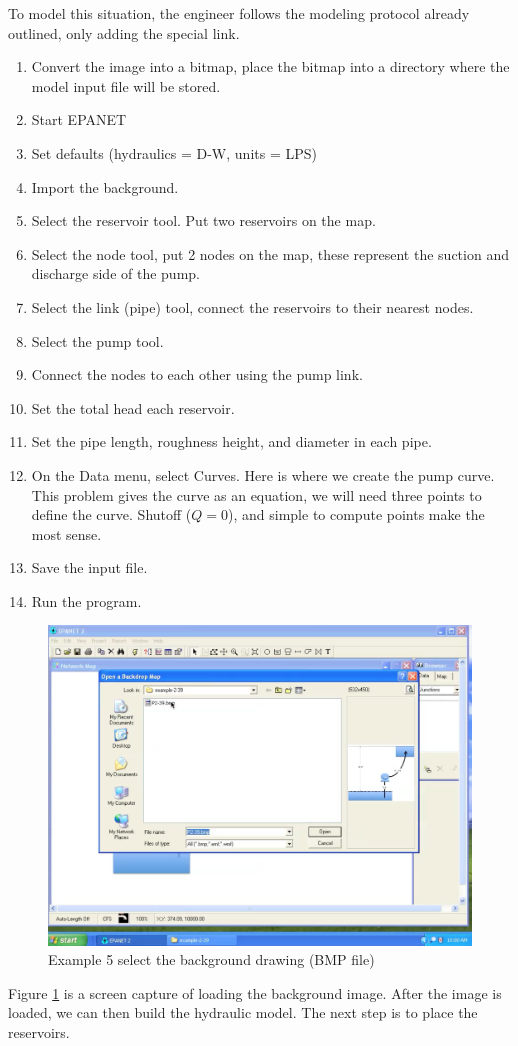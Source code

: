 To model this situation, the engineer follows the modeling protocol already outlined, only adding the special link.
\begin{enumerate}
\item Convert the image into a bitmap, place the bitmap into a directory where the model input file will be stored.
\item Start EPANET
\item Set defaults (hydraulics = D-W,  units = LPS)
\item Import the background.
\item Select the reservoir tool.  Put two reservoirs on the map.
\item Select the node tool, put 2 nodes on the map, these represent the suction and discharge side of the pump.
\item Select the link (pipe) tool, connect the reservoirs to their nearest nodes.  
\item Select the pump tool.
\item Connect the nodes to each other using the pump link.
\item Set the total head each reservoir.
\item Set the pipe length, roughness height, and diameter in each pipe.
\item On the Data menu, select Curves.  Here is where we create the pump curve.   This problem gives the curve as an equation, we will need three points to define the curve.   Shutoff ($Q=0$), and simple to compute points make the most sense.
\item Save the input file.
\item Run the program.   
\end{enumerate}

\begin{figure}[htbp] %
   \centering
   \includegraphics[width=5in]{pump-background.pdf} 
   \caption{Example 5 select the background drawing (BMP file)}
   \label{fig:pump-background.pdf}
\end{figure}
Figure \ref{fig:pump-background.pdf} is a screen capture of loading the background image.   After the image is loaded, we can then build the hydraulic model.  The next step is to place the reservoirs.
\clearpage

